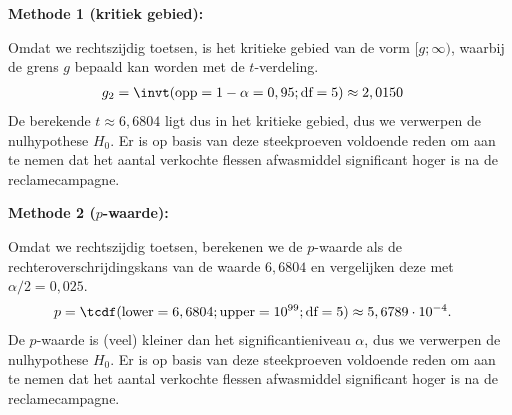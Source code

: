 {    {\bfseries Methode 1 (kritiek gebied):}

    Omdat we rechtszijdig toetsen, is het kritieke gebied van de vorm $[g; \infty)$, waarbij de grens $g$ bepaald kan worden met de $t$-verdeling.
    \begin{align*}
        g_2 &= \invt(\text{opp}=1-\alpha = 0,95; \text{df}=5) \approx 2,0150
    \end{align*}
    De berekende $t \approx 6,6804$ ligt dus in het kritieke gebied, dus we verwerpen de nulhypothese $H_0$.
    Er is op basis van deze steekproeven voldoende reden om aan te nemen dat het aantal verkochte flessen afwasmiddel significant hoger is na de reclamecampagne.

    {\bfseries Methode 2 ($p$-waarde):}
    
    Omdat we rechtszijdig toetsen, berekenen we de $p$-waarde als de rechteroverschrijdingskans van de waarde $6,6804$ en vergelijken deze met $\alpha/2 = 0,025$.
    \begin{align*}
        p &= \tcdf(\text{lower}=6,6804; \text{upper}=10^{99}; \text{df}=5) \approx 5,6789 \cdot 10^{-4}.
    \end{align*}
    De $p$-waarde is (veel) kleiner dan het significantieniveau $\alpha$, dus we verwerpen de nulhypothese $H_0$.
    Er is op basis van deze steekproeven voldoende reden om aan te nemen dat het aantal verkochte flessen afwasmiddel significant hoger is na de reclamecampagne.
}